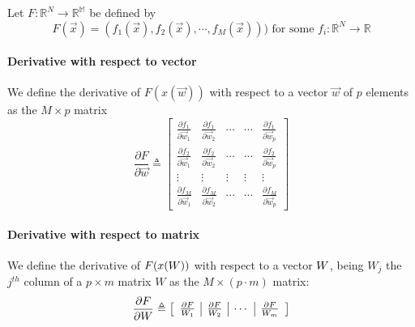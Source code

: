 
Let $F:\mathbb{R}^N \rightarrow \mathbb{R^M}$ be defined by
\begin{equation}
F(\vec{x}) = (f_1(\vec{x}),f_2(\vec{x}),\cdots,f_M(\vec{x}))) \text{    for some  } f_i:\mathbb{R}^N \rightarrow \mathbb{R}
\end{equation}


\paragraph{Derivative with respect to vector}

We define the derivative of $F(x(\vec{w}))$ with respect to a vector $\vec{w}$ of $p$ elements as the $M \times p$ matrix
\begin{equation}
\frac{\partial F}{\partial \vec{w}} \triangleq
\begin{bmatrix}
   \frac{\partial f_1}{\partial \vec{w}_1}    & \frac{\partial f_1}{\partial \vec{w}_2}                & \cdots      & \cdots       & \frac{\partial f_1}{\partial \vec{w}_p}  \\
   \frac{\partial f_2}{\partial \vec{w}_1}    & \frac{\partial f_2}{\partial \vec{w}_2}                & \cdots      & \cdots       & \frac{\partial f_2}{\partial \vec{w}_p}  \\
   \vdots                & \vdots           & \vdots      & \vdots       &\vdots\\
   \frac{\partial f_M}{\partial \vec{w}_1}    & \frac{\partial f_M}{\partial \vec{w}_2}                & \cdots      & \cdots       & \frac{\partial f_M}{\partial \vec{w}_p}
\end{bmatrix}
\end{equation}



\paragraph{Derivative with respect to matrix}


We define the derivative of $F(x(W))$ with respect to a vector $W$, being $W_j$ the $j^{th}$ column of a $p\times m$ matrix $W$ as the $M\times (p \cdot m )$ matrix:
\begin{equation}
\frac{\partial F}{\partial W} \triangleq
\left[
\begin{array}{c|c|c|c}
\frac{\partial F}{W_1} & \frac{\partial F}{W_2} & \cdots & \frac{\partial F}{W_m} \\
\end{array}
\right]
\end{equation}




